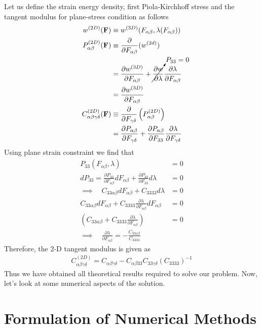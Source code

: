 \message{ !name(p2.tex)}\documentclass[../main.tex]{subfiles}
\begin{document}
Let us define the strain energy density, first Piola-Kirchhoff stress
and the tangent modulus for plane-stress condition as follows
\begin{align*}
  w^{(2D)}(\mathbf{F}) &\equiv w^{(3D)}(F_{\alpha\beta},\lambda(F_{\alpha\beta}))\\
  P^{(2D)}_{\alpha\beta}(\mathbf{F})&\equiv \frac{\partial}{\partial F_{\alpha\beta}}(w^{(2d)})\\
                       &= \frac{\partial w^{(3D)}}{\partial F_{\alpha\beta}} +\cancelto{P_{33}=0}{\frac{\partial w}{\partial \lambda}}\frac{\partial \lambda}{\partial F_{\alpha\beta}}\\
                       &= \frac{\partial w^{(3D)}}{\partial F_{\alpha\beta}}\\
  C^{(2D)}_{\alpha\beta\gamma\delta}(\mathbf{F})&\equiv \frac{\partial}{\partial F_{\gamma\delta}}\left(P^{(2D)}_{\alpha\beta}\right)\\
                       &=\frac{\partial P_{\alpha\beta}}{\partial F_{\gamma\delta}} + \frac{\partial P_{\alpha\beta}}{\partial F_{33}}\frac{\partial\lambda}{\partial F_{\gamma\delta}}
\end{align*}
Using plane strain constraint we find that
\begin{align*}
  P_{33}(F_{\alpha\beta},\lambda)&=0\\
  dP_{33} = \frac{\partial P_{33}}{\partial F_{\alpha\beta}}dF_{\alpha\beta} + \frac{\partial P_{33}}{\partial F_{33}}d\lambda &= 0\\
  \implies \quad C_{33\alpha\beta}dF_{\alpha\beta}+C_{3333}d\lambda &=0\\
  C_{33\alpha\beta}dF_{\alpha\beta}+C_{3333}\frac{\partial\lambda}{\partial F_{\alpha\beta}}dF_{\alpha\beta} &=0\\
  \left(C_{33\alpha\beta}+C_{3333}\frac{\partial\lambda}{\partial F_{\alpha\beta}}\right) &=0\\
  \implies\quad\boxed{\frac{\partial\lambda}{\partial F_{\alpha\beta}} = -\frac{C_{33\alpha\beta}}{C_{3333}}}
\end{align*}
Therefore, the 2-D tangent modulus is given as
\begin{align*}
  \boxed{C^{(2D)}_{\alpha\beta\gamma\delta} = C_{\alpha\beta\gamma\delta} - C_{\alpha\beta33}C_{33\gamma\delta}\left(C_{3333}\right)^{-1}}
\end{align*}
Thus we have obtained all theoretical results required to solve our
problem. Now, let's look at some numerical aspects of the solution.
\section{Formulation of Numerical Methods}
\end{document}
